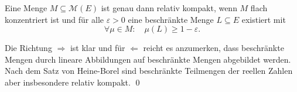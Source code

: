 \begin{corollary}
    Eine Menge $M \subseteq \mathcal{M}(E)$ ist genau dann relativ kompakt, wenn $M$ flach konzentriert ist und für alle $\varepsilon > 0$ eine beschränkte Menge $L \subseteq E$ existiert mit
    $$
        \forall \mu \in M: \quad \mu(L) \geq 1 - \varepsilon. 
    $$
\end{corollary}

\begin{proof*}
    Die Richtung $\Rightarrow$ ist klar und für $\Leftarrow$ reicht es anzumerken, dass beschränkte Mengen durch lineare Abbildungen auf beschränkte Mengen abgebildet werden. Nach dem Satz von Heine-Borel sind 
    beschränkte Teilmengen der reellen Zahlen aber insbesondere relativ kompakt. \qed 
\end{proof*}


